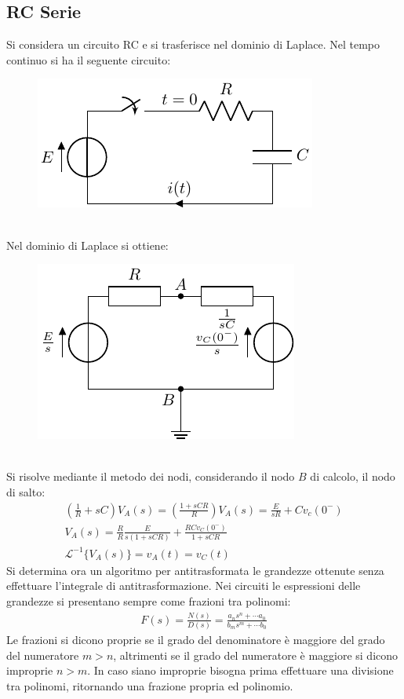 \documentclass{article}
\numberwithin{equation}{subsection}
\begin{document}
\subsection{RC Serie}

Si considera un circuito RC e si trasferisce nel dominio di Laplace. Nel tempo continuo si ha il seguente circuito:
\begin{figure}[ht]%
    \centering
    \includegraphics{circuito-rc-tempo-continuo.pdf}
    \label{fig:circuito-rc-tempo-continuo}
\end{figure}
\\
Nel dominio di Laplace si ottiene:
\begin{figure}[ht]%
    \centering
    \includegraphics{circuito-rc-laplace.pdf}
    \label{fig:circuito-rc-laplace}
\end{figure}
\\
Si risolve mediante il metodo dei nodi, considerando il nodo $B$ di calcolo, il nodo di salto:
\begin{gather*}
    \left(\displaystyle\frac{1}{R}+sC\right)V_A(s)=\left(\frac{1+sCR}{R}\right)V_A(s)=\displaystyle\frac{E}{sR}+Cv_c(0^-)\\
    V_A(s)=\displaystyle\frac{R}{R}\frac{E}{s(1+sCR)}+\frac{RCv_C(0^-)}{1+sCR}\\
    \mathcal{L}^{-1}\{V_A(s)\}=v_A(t)= v_C(t)
\end{gather*}
Si determina ora un algoritmo per antitrasformata le grandezze ottenute senza effettuare l'integrale di antitrasformazione. 
Nei circuiti le espressioni delle grandezze si presentano sempre come frazioni tra polinomi:
\begin{gather*}
    F(s)=\displaystyle\frac{N(s)}{D(s)}=\frac{a_ns^n+\cdots a_0}{b_ms^m+\cdots b_0}
\end{gather*}
Le frazioni si dicono proprie se il grado del denominatore è maggiore del grado del numeratore $m>n$, altrimenti se il grado del numeratore è maggiore si dicono improprie $n>m$. 
In caso siano improprie bisogna prima effettuare una divisione tra polinomi, ritornando una frazione propria ed polinomio.
\end{document}
